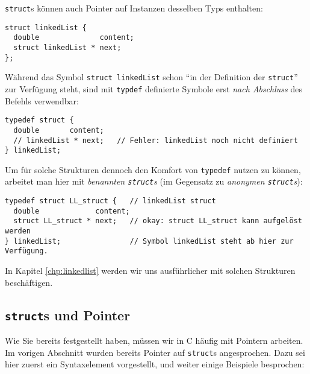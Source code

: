 \texttt{struct}s können auch Pointer auf Instanzen desselben Typs enthalten:
\begin{codebox}
\begin{verbatim}
struct linkedList {
  double              content;
  struct linkedList * next;
};
\end{verbatim}
\end{codebox}

Während das Symbol \texttt{struct linkedList} schon \enquote{in der Definition der \texttt{struct}} zur Verfügung steht, sind mit \texttt{typdef} definierte Symbole erst \emph{nach Abschluss} des Befehls verwendbar:

\begin{warnbox}[Beispiel: \texttt{typedef} und \texttt{struct} mit Referenz auf Instanz gleichen Typs (fehlerhaft), leftupper=7mm]
\begin{verbatim}
typedef struct {
  double       content;
  // linkedList * next;   // Fehler: linkedList noch nicht definiert
} linkedList;
\end{verbatim}
\end{warnbox}

Um für solche Strukturen dennoch den Komfort von \texttt{typedef} nutzen zu können, arbeitet man hier mit \emph{benannten \texttt{struct}s} (im Gegensatz zu \emph{anonymen \texttt{struct}s}):

\begin{codebox}
\begin{verbatim}
typedef struct LL_struct {   // linkedList struct
  double             content;
  struct LL_struct * next;   // okay: struct LL_struct kann aufgelöst werden
} linkedList;                // Symbol linkedList steht ab hier zur Verfügung.
\end{verbatim}
\end{codebox}

In Kapitel \ref{chp:linkedlist} werden wir uns ausführlicher mit solchen Strukturen beschäftigen.

\subsection{\texttt{struct}s und Pointer}
Wie Sie bereits festgestellt haben, müssen wir in C häufig mit Pointern arbeiten. Im vorigen Abschnitt wurden bereits Pointer auf \texttt{struct}s angesprochen. Dazu sei hier zuerst ein Syntaxelement vorgestellt, und weiter einige Beispiele besprochen:

